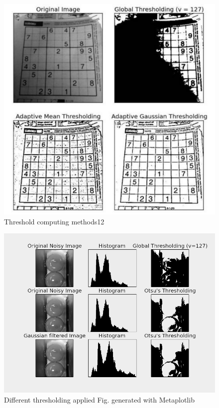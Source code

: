 \documentclass[12pt,twoside,a4paper]{article}
\begin{document}
\begin{figure}[H]
\centering
\includegraphics[width=0.4\paperwidth]{thremeth}
\caption{Threshold computing methods12\cite{thre}}
\end{figure}
 
\begin{figure}[H]
\centering
\includegraphics[width=0.4\paperwidth]{diffthr}
\caption{Different thresholding applied
Fig. generated with Metaplotlib}
\end{figure}
\end{document}
